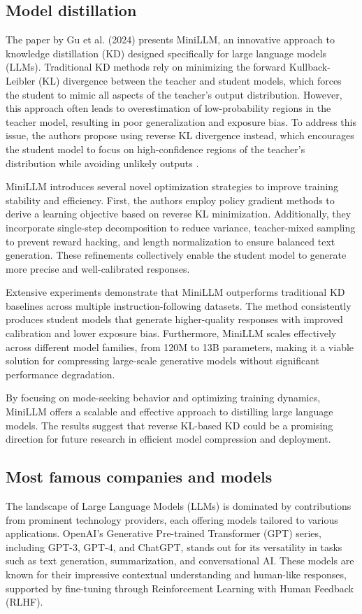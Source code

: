 \subsection{Model distillation}
The paper by Gu et al. (2024) presents MiniLLM, an innovative approach to knowledge distillation (KD) designed specifically for large language models (LLMs). Traditional KD methods rely on minimizing the forward Kullback-Leibler (KL) divergence between the teacher and student models, which forces the student to mimic all aspects of the teacher’s output distribution. However, this approach often leads to overestimation of low-probability regions in the teacher model, resulting in poor generalization and exposure bias. To address this issue, the authors propose using reverse KL divergence instead, which encourages the student model to focus on high-confidence regions of the teacher's distribution while avoiding unlikely outputs \cite{gu2024}.

MiniLLM introduces several novel optimization strategies to improve training stability and efficiency. First, the authors employ policy gradient methods to derive a learning objective based on reverse KL minimization. Additionally, they incorporate single-step decomposition to reduce variance, teacher-mixed sampling to prevent reward hacking, and length normalization to ensure balanced text generation. These refinements collectively enable the student model to generate more precise and well-calibrated responses.

Extensive experiments demonstrate that MiniLLM outperforms traditional KD baselines across multiple instruction-following datasets. The method consistently produces student models that generate higher-quality responses with improved calibration and lower exposure bias. Furthermore, MiniLLM scales effectively across different model families, from 120M to 13B parameters, making it a viable solution for compressing large-scale generative models without significant performance degradation.

By focusing on mode-seeking behavior and optimizing training dynamics, MiniLLM offers a scalable and effective approach to distilling large language models. The results suggest that reverse KL-based KD could be a promising direction for future research in efficient model compression and deployment.


\subsection{Most famous companies and models}
The landscape of Large Language Models (LLMs) is dominated by contributions from prominent technology providers, each offering models tailored to various applications. OpenAI's Generative Pre-trained Transformer (GPT) series, including GPT-3, GPT-4, and ChatGPT, stands out for its versatility in tasks such as text generation, summarization, and conversational AI. These models are known for their impressive contextual understanding and human-like responses, supported by fine-tuning through Reinforcement Learning with Human Feedback (RLHF).

